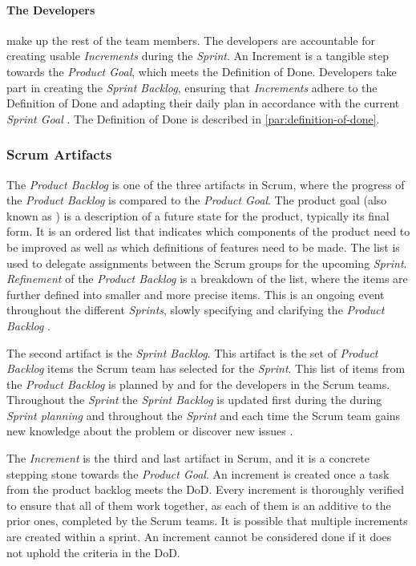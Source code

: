 \paragraph{The Developers}
make up the rest of the team members.
The developers are accountable for creating usable \emph{Increments} during the \emph{Sprint}. 
An Increment is a tangible step towards the \emph{Product Goal}, which meets the Definition of Done. 
Developers take part in creating the \emph{Sprint Backlog}, ensuring that \emph{Increments} adhere to the Definition of Done and adapting their daily plan in accordance with the current \emph{Sprint Goal} \cite{schwaber_sutherland_2022}.
The Definition of Done is described in \autoref{par:definition-of-done}.

\subsubsection{Scrum Artifacts}
The \emph{Product Backlog} is one of the three artifacts in Scrum, where the progress of the \emph{Product Backlog} is compared to the \emph{Product Goal}.
The product goal (also known as ) is a description of a future state for the product, typically its final form.
It is an ordered list that indicates which components of the product need to be improved as well as which definitions of features need to be made.
The list is used to delegate assignments between the Scrum groups for the upcoming \emph{Sprint}.
\emph{Refinement} of the \emph{Product Backlog} is a breakdown of the list, where the items are further defined into smaller and more precise items.
This is an ongoing event throughout the different \emph{Sprints}, slowly specifying and clarifying the \emph{Product Backlog} \cite{schwaber_sutherland_2022}. 

The second artifact is the \emph{Sprint Backlog}. 
This artifact is the set of \emph{Product Backlog} items the Scrum team has selected for the \emph{Sprint}. 
This list of items from the \emph{Product Backlog} is planned by and for the developers in the Scrum teams. 
Throughout the \emph{Sprint} the \emph{Sprint Backlog} is updated first during the during \emph{Sprint planning} and throughout the \emph{Sprint} and each time the Scrum team gains new knowledge about the problem or discover new issues \cite{schwaber_sutherland_2022}. 

The \emph{Increment} is the third and last artifact in Scrum, and it is a concrete stepping stone towards the \emph{Product Goal}.
An increment is created once a task from the product backlog meets the DoD. 
Every increment is thoroughly verified to ensure that all of them work together, as each of them is an additive to the prior ones, completed by the Scrum teams.
It is possible that multiple increments are created within a sprint.
An increment cannot be considered done if it does not uphold the criteria in the DoD\cite{schwaber_sutherland_2022}.

